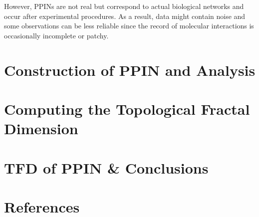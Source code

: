 \documentclass[10pt,twoside]{pnas-new}
\begin{document}
However, PPINs are not real but correspond to actual biological networks and occur after experimental procedures. As a result, data might contain noise and some observations can be less reliable since the record of molecular interactions is occasionally incomplete or patchy.

\section{Construction of PPIN and Analysis}


\section{Computing the Topological Fractal Dimension}


\newpage
\section{TFD of PPIN \& Conclusions}


\section*{References}

\newpage


\end{document}
